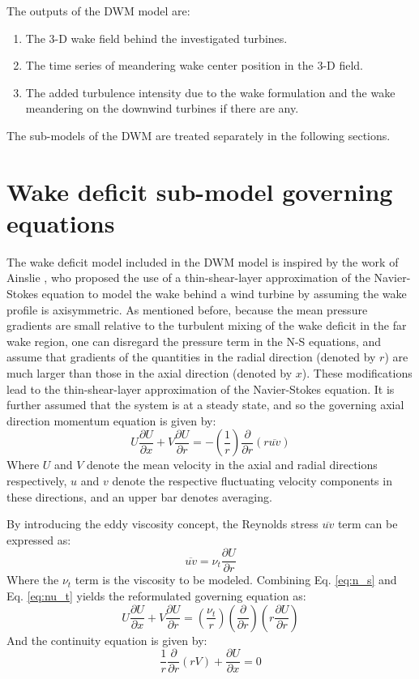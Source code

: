 \documentclass{umthesis}
\begin{document}
The outputs of the DWM model are:
\begin{enumerate}
  \item The 3-D wake field behind the investigated turbines.
  \item The time series of meandering wake center position in the 3-D field.
  \item The added turbulence intensity due to the wake formulation and the wake meandering on the downwind turbines if there are any.
\end{enumerate}

The sub-models of the DWM are treated separately in the following sections.


\section{Wake deficit sub-model governing equations}\label{sec:wake_eqn}
The wake deficit model included in the DWM model is inspired by the work of Ainslie \cite{Ainslie_flow}, who proposed the use of a thin-shear-layer approximation of the Navier-Stokes equation to model the wake behind a wind turbine by assuming the wake profile is axisymmetric. As mentioned before, because the mean pressure gradients are small relative to the turbulent mixing of the wake deficit in the far wake region, one can disregard the pressure term in the N-S equations, and assume that gradients of the quantities in the radial direction (denoted by $r$) are much larger than those in the axial direction (denoted by $x$). These modifications lead to the thin-shear-layer approximation of the Navier-Stokes equation. It is further assumed that the system is at a steady state, and so the governing axial direction momentum equation is given by:
\begin{equation}\label{eq:n_s}
  U\frac{\partial U}{\partial x}+V\frac{\partial U}{\partial r}=-(\frac{1}{r})\frac{\partial}{\partial r}(r\overline{uv})
\end{equation}
Where $U$ and $V$ denote the mean velocity in the axial and radial directions respectively, $u$ and $v$ denote the respective fluctuating velocity components in these directions, and an upper bar denotes averaging.

By introducing the eddy viscosity concept, the Reynolds stress $\overline{uv}$ term can be expressed as:
\begin{equation}\label{eq:nu_t}
  \overline{uv}=\nu_t\frac{\partial U}{\partial r}
\end{equation}
Where the $\nu_t$ term is the viscosity to be modeled. Combining Eq. \ref{eq:n_s} and Eq. \ref{eq:nu_t} yields the reformulated governing equation as:
\begin{equation}\label{eq:x_momentum_1}
  U\frac{\partial U}{\partial x}+V\frac{\partial U}{\partial r}=(\frac{\nu_t}{r})(\frac{\partial}{\partial r})(r\frac{\partial U}{\partial r})
\end{equation}
And the continuity equation is given by:
\begin{equation}\label{eq:continuity_1}
  \frac{1}{r}\frac{\partial}{\partial r}(rV)+\frac{\partial U}{\partial x}=0
\end{equation}
\end{document}
